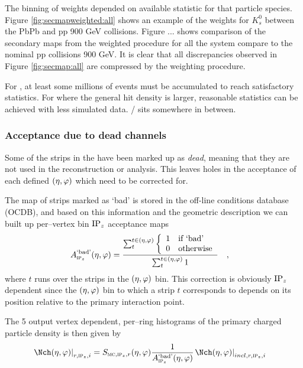 \documentclass[compat,11pt]{alicenote}
\DeclareRobustCommand{\AlwaysText}[1]{\ifmmode\relax\text{#1}\else #1\fi}
\newcommand*\OCDB{\AlwaysText{OCDB}}
\newcommand*{\etaphi}{\ensuremath(\eta,\varphi)}
\newcommand*\SecMap{\ensuremath S_{\subMC,\subIPz,r}\etaphi}
\newcommand{\dndetadphi}[1][]{{\ensuremath%
    \ifx|#1|\else\left.\fi%
      \Nch\etaphi%
      \ifx|#1|\else\right|_{#1}\fi}}
\newcommand{\DeadCh}{\ensuremath A^{\text{`bad'}}_{\subIPz}\etaphi}
\begin{document}
The binning of weights depended on available statistic for that particle species.   
Figure \ref {fig:secmapweighted:all} shows an example of the weights for $K^{0}_{s}$  between the PbPb and pp 900 GeV collisions.
Figure ... shows comparison of the secondary maps from the weighted procedure for all the system compare to the nominal pp collisions 900 GeV.
It is clear that all discrepancies observed in Figure \ref{fig:secmap:all} 
are compressed by the weighting procedure.

For \ppCol{}, at least some millions of events must be accumulated to
reach satisfactory statistics.  For \PbPbCol{} where the general hit
density is larger, reasonable statistics can be achieved with less
simulated data. \pPbCol{}/\PbpCol{} sits somewhere in between. 

\subsubsection{Acceptance due to dead channels}

Some of the strips in the \FMD{} have been marked up as \emph{dead},
meaning that they are not used in the reconstruction or analysis.
This leaves holes in the acceptance of each defined $\etaphi$ which
need to be corrected for.

The map of strips marked as `bad' is stored in the off-line conditions
database (\OCDB{}), and based on this information and the geometric
description we can built up per--vertex bin $\IPz$ acceptance maps
\begin{align}
  \label{eq:dead_channels} 
  \DeadCh{} &= 
  \frac{\sum_t^{t\in\etaphi}\left\{\begin{array}{cl}
        1 & \text{if `bad'}\\
        0 & \text{otherwise}
      \end{array}\right.}{\sum_t^{t\in\etaphi} 1}\quad,
\end{align}
where $t$ runs over the strips in the $\etaphi$ bin.  This correction
is obviously $\IPz$ dependent since the $\etaphi$ bin to which a strip $t$
corresponds to depends on its position relative to the primary
interaction point. 

The 5 output vertex dependent, per--ring histograms of the primary
charged particle density is then given by
\begin{align}
  \dndetadphi[r,\subIPz,i] &=
  \SecMap{} \frac{1}{\DeadCh{}}\dndetadphi[incl,r,\subIPz,i]
\end{align}
\end{document}
